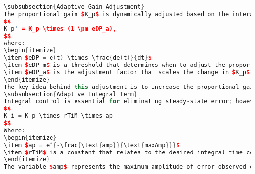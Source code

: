 \documentclass[a4paper,12pt]{article}
\begin{document}
\begin{lstlising}[language=C++]
\begin{lstlisting}[language=C++]
\subsubsection{Adaptive Gain Adjustment}
The proportional gain $K_p$ is dynamically adjusted based on the interaction between the current error $e(t)$ and its rate of change (derivative). This adjustment is designed to improve the responsiveness of the controller to changing conditions. The adaptation can be mathematically expressed as follows:
$$
K_p' = K_p \times (1 \pm eDP_a),
$$
where:
\begin{itemize}
\item $eDP = e(t) \times \frac{de(t)}{dt}$
\item $eDP_m$ is a threshold that determines when to adjust the proportional gain.
\item $eDP_a$ is the adjustment factor that scales the change in $K_p$ based on the error’s derivative. 
\end{itemize}
The key idea behind this adjustment is to increase the proportional gain when the system is experiencing a large error combined with a significant rate of change, which could indicate an approaching overshoot or oscillation. Conversely, if the error is decreasing but remains large, it may reduce the proportional gain to prevent excessive correction, allowing the system to stabilize more smoothly.
\subsubsection{Adaptive Integral Term}
Integral control is essential for eliminating steady-state error; however, it can lead to issues like integral windup, where the integral term accumulates excessively during periods of sustained error. To mitigate this, the integral gain $K_i$ is adaptively computed as follows:
$$
K_i = K_p \times rTiM \times ap
$$
Where:
\begin{itemize}
\item $ap = e^{-\frac{\text{amp}}{\text{maxAmp}}}$
\item $rTiM$ is a constant that relates to the desired integral time constant.
\end{itemize}
The variable $amp$ represents the maximum amplitude of error observed over a session. By using the exponential decay factor $ap$, the contribution of the integral term is diminished during periods of high error, effectively reducing the risk of windup. When the error is within an acceptable range, $ap$ approaches 1, allowing the integral term to contribute effectively to the control output.

\end{lstlisting}
\end{lstlising}
\end{document}
